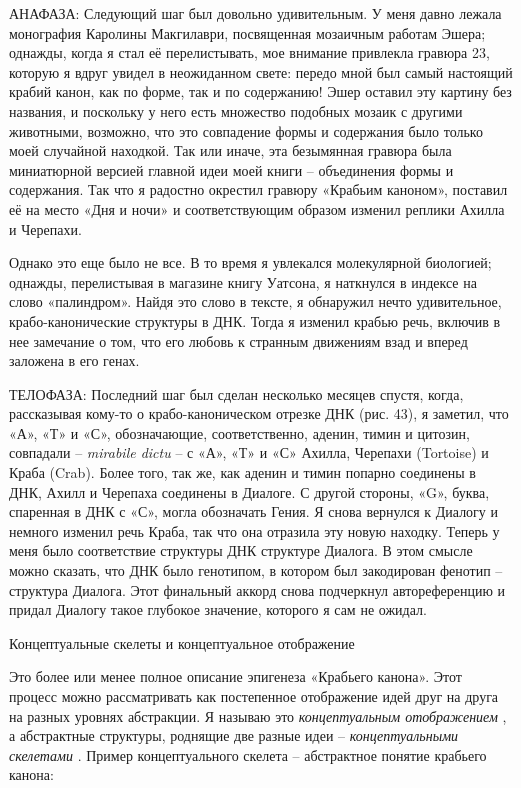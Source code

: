 \documentclass[../main.tex]{subfiles}
\begin{document}
АНАФАЗА: Следующий шаг был довольно удивительным. У меня давно лежала монография Каролины Макгилаври, посвященная мозаичным работам Эшера; однажды, когда я стал её перелистывать, мое внимание привлекла гравюра 23, которую я вдруг увидел в неожиданном свете: передо мной был самый настоящий крабий канон, как по форме, так и по содержанию! Эшер оставил эту картину без названия, и поскольку у него есть множество подобных мозаик с другими животными, возможно, что это совпадение формы и содержания было только моей случайной находкой. Так или иначе, эта безымянная гравюра была миниатюрной версией главной идеи моей книги \--- объединения формы и содержания. Так что я радостно окрестил гравюру «Крабьим каноном», поставил её на место «Дня и ночи» и соответствующим образом изменил реплики Ахилла и Черепахи.

Однако это еще было не все. В то время я увлекался молекулярной биологией; однажды, перелистывая в магазине книгу Уатсона, я наткнулся в индексе на слово «палиндром». Найдя это слово в тексте, я обнаружил нечто удивительное, крабо-канонические структуры в ДНК\@. Тогда я изменил крабью речь, включив в нее замечание о том, что его любовь к странным движениям взад и вперед заложена в его генах.

ТЕЛОФАЗА: Последний шаг был сделан несколько месяцев спустя, когда, рассказывая кому-то о крабо-каноническом отрезке ДНК (рис. 43), я заметил, что «А», «Т» и «С», обозначающие, соответственно, аденин, тимин и цитозин, совпадали \--- \emph{mirabile dictu} \--- с «А», «Т» и «С» Ахилла, Черепахи (Tortoise) и Краба (Crab). Более того, так же, как аденин и тимин попарно соединены в ДНК, Ахилл и Черепаха соединены в Диалоге. С другой стороны, «G», буква, спаренная в ДНК с «С», могла обозначать Гения. Я снова вернулся к Диалогу и немного изменил речь Краба, так что она отразила эту новую находку. Теперь у меня было соответствие структуры ДНК структуре Диалога. В этом смысле можно сказать, что ДНК было генотипом, в котором был закодирован фенотип \--- структура Диалога. Этот финальный аккорд снова подчеркнул автореференцию и придал Диалогу такое глубокое значение, которого я сам не ожидал.

Концептуальные скелеты и концептуальное отображение

Это более или менее полное описание эпигенеза «Крабьего канона». Этот процесс можно рассматривать как постепенное отображение идей друг на друга на разных уровнях абстракции. Я называю это \emph{концептуальным отображением} , а абстрактные структуры, роднящие две разные идеи \--- \emph{концептуальными скелетами} . Пример концептуального скелета \--- абстрактное понятие крабьего канона:
\end{document}
